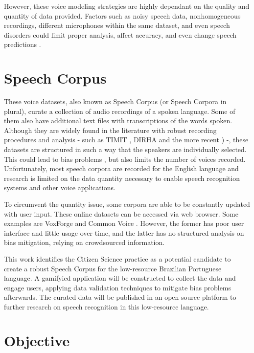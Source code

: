 However, these voice modeling strategies are highly dependant on the quality and quantity of data provided. Factors such as noisy speech data, nonhomogeneous recordings, different microphones within the same dataset, and even speech disorders could limit proper analysis, affect accuracy, and even change speech predictions \cite{cooke2001robust}. 

\section*{Speech Corpus}

These voice datasets, also known as Speech Corpus (or Speech Corpora in plural), curate a collection of audio recordings of a spoken language. Some of them also have additional text files with transcriptions of the words spoken. Although they are widely found in the literature with robust recording procedures and analysis - such as TIMIT \cite{Lamel1992timmit}, DIRHA \cite{Ravanelli2016dirha} and the more recent \cite{chanchaochai2018globaltimit}) -, these datasets are structured in such a way that the speakers are individually selected. This could lead to bias problems \cite{bender2018data}, but also limits the number of voices recorded. Unfortunately, most speech corpora are recorded for the English language \cite{LeRouxVincent2014TRdatasets} and research is limited on the data quantity necessary to enable speech recognition systems and other voice applications.

To circumvent the quantity issue, some corpora are able to be constantly updated with user input. These online datasets can be accessed via web browser. Some examples are VoxForge and Common Voice \cite{ardila2019common}. However, the former has poor user interface and little usage over time, and the latter has no structured analysis on bias mitigation, relying on crowdsourced information.

This work identifies the Citizen Science practice as a potential candidate to create a robust Speech Corpus for the low-resource Brazilian Portuguese language. A gamifyied application will be constructed to collect the data and engage users, applying data validation techniques to mitigate bias problems afterwards. The curated data will be published in an open-source platform to further research on speech recognition in this low-resource language.

\section*{Objective}

